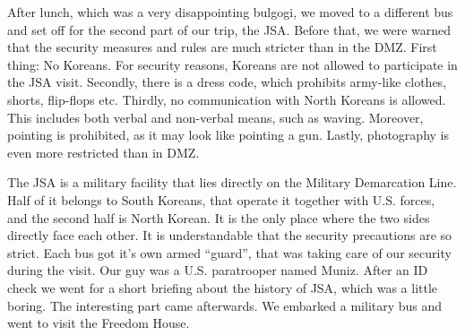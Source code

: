 \begin{post}
\begin{content}
After lunch, which was a very disappointing bulgogi, we moved to a different bus and set off for the second part of our trip, the JSA. Before that, we were warned that the security measures and rules are much stricter than in the DMZ. First thing: No Koreans. For security reasons, Koreans are not allowed to participate in the JSA visit. Secondly, there is a dress code, which prohibits army-like clothes, shorts, flip-flops etc. Thirdly, no communication with North Koreans is allowed. This includes both verbal and non-verbal means, such as waving. Moreover, pointing is prohibited, as it may look like pointing a gun. Lastly, photography is even more restricted than in DMZ.

The JSA is a military facility that lies directly on the Military Demarcation Line. Half of it belongs to South Koreans, that operate it together with U.S. forces, and the second half is North Korean. It is the only place where the two sides directly face each other. It is understandable that the security precautions are so strict. Each bus got it's own armed ``guard'', that was taking care of our security during the visit. Our guy was a U.S. paratrooper named Muniz. After an ID check we went for a short briefing about the history of JSA, which was a little boring. The interesting part came afterwards. We embarked a military bus and went to visit the Freedom House.

\begin{figure}
\vspace{-12pt}
\centering{}
\vspace{-26pt}
\end{figure}



\end{content}
\end{post}

